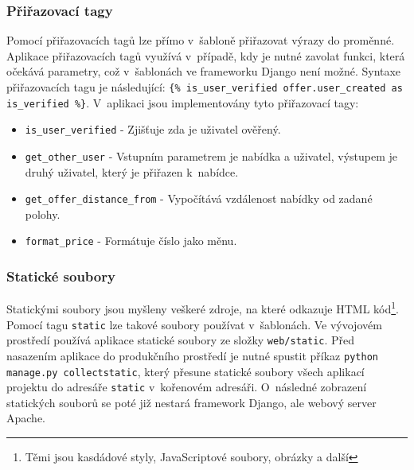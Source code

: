 \subsubsection{Přiřazovací tagy}
\begin{sloppypar}
Pomocí přiřazovacích tagů lze přímo v~šabloně přiřazovat výrazy do proměnné. Aplikace přiřazovacích tagů využívá v~případě, kdy je nutné zavolat funkci, která očekává parametry, což v~šablonách ve frameworku Django není možné. Syntaxe přiřazovacích tagu je následující: \mbox{\texttt{\{\% is\_user\_verified offer.user\_created as is\_verified \%\}}}. V~aplikaci jsou implementovány tyto přiřazovací tagy:
\begin{itemize}
    \item \texttt{is\_user\_verified} - Zjišťuje zda je uživatel ověřený.
    \item \texttt{get\_other\_user} - Vstupním parametrem je nabídka a uživatel, výstupem je druhý uživatel, který je přiřazen k~nabídce.
    \item \texttt{get\_offer\_distance\_from} - Vypočítává vzdálenost nabídky od zadané polohy.
    \item \texttt{format\_price} - Formátuje číslo jako měnu.
\end{itemize}
\end{sloppypar}

\subsubsection{Statické soubory}
Statickými soubory jsou myšleny veškeré zdroje, na které odkazuje HTML kód\footnote{Těmi jsou kasdádové styly, JavaScriptové soubory, obrázky a další}. Pomocí tagu \texttt{static} lze takové soubory používat v~šablonách. Ve vývojovém prostředí používá aplikace statické soubory ze složky \texttt{web/static}. Před nasazením aplikace do produkčního prostředí je nutné spustit příkaz \mbox{\texttt{python manage.py collectstatic}}, který přesune statické soubory všech aplikací projektu do adresáře \texttt{static} v~kořenovém adresáři. O~následné zobrazení statických souborů se poté již nestará framework Django, ale webový server Apache.

